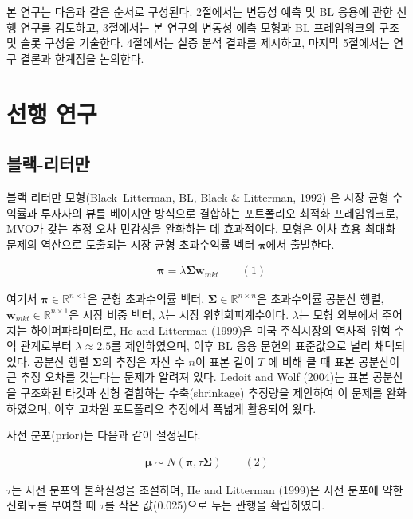 \documentclass{article}
\begin{document}
본 연구는 다음과 같은 순서로 구성된다. 2절에서는 변동성 예측 및 BL 응용에 관한 선행 연구를 검토하고, 3절에서는 본 연구의 변동성 예측 모형과 BL 프레임워크의 구조 및 슬롯 구성을 기술한다. 4절에서는 실증 분석 결과를 제시하고, 마지막 5절에서는 연구 결론과 한계점을 논의한다.

\section{선행 연구}\label{sec:related_work}

\subsection{블랙-리터만}
\label{subsec:bl_review}

블랙-리터만 모형(Black–Litterman, BL, Black & Litterman, 1992) 은 시장 균형 수익률과 투자자의 뷰를 베이지안 방식으로 결합하는 포트폴리오 최적화 프레임워크로, MVO가 갖는 추정 오차 민감성을 완화하는 데 효과적이다. 모형은 이차 효용 최대화 문제의 역산으로 도출되는 시장 균형 초과수익률 벡터 $\boldsymbol{\pi}$에서 출발한다.

\begin{align}
    & \boldsymbol{\pi} = \lambda\boldsymbol{\Sigma}\mathbf{w}_{mkt} \qquad(1)\end{align}

여기서 $\boldsymbol{\pi} \in \mathbb{R}^{n \times 1}$은 균형 초과수익률 벡터, $\boldsymbol{\Sigma}\in \mathbb{R}^{n \times n}$은 초과수익률 공분산 행렬, $\mathbf{w}_{mkt} \in \mathbb{R}^{n \times 1}$은 시장 비중 벡터, $\lambda$는 시장 위험회피계수이다. $\lambda$는 모형 외부에서 주어지는 하이퍼파라미터로, He and Litterman (1999)은 미국 주식시장의 역사적 위험-수익 관계로부터 $\lambda \approx 2.5$를 제안하였으며, 이후 BL 응용 문헌의 표준값으로 널리 채택되었다. 공분산 행렬 $\boldsymbol{\Sigma}$의 추정은 자산 수 $n$이 표본 길이 $T$ 에 비해 클 때 표본 공분산이 큰 추정 오차를 갖는다는 문제가 알려져 있다. Ledoit and Wolf (2004)는 표본 공분산을 구조화된 타깃과 선형 결합하는 수축(shrinkage) 추정량을 제안하여 이 문제를 완화하였으며, 이후 고차원 포트폴리오 추정에서 폭넓게 활용되어 왔다.

사전 분포(prior)는 다음과 같이 설정된다.

\begin{align}
    \boldsymbol{\mu} \sim N(\boldsymbol{\pi}, \tau\boldsymbol{\Sigma}) \qquad(2)\end{align}

$\tau$는 사전 분포의 불확실성을 조절하며, He and Litterman (1999)은 사전 분포에 약한 신뢰도를 부여할 때 $\tau$를 작은 값(0.025)으로 두는 관행을 확립하였다.
\end{document}
